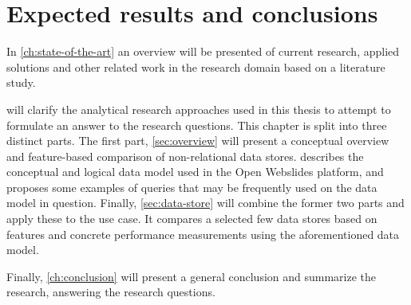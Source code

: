 \section{Expected results and conclusions}
\label{sec:expected-results-and-conclusions}


\clearpage{}

In \cref{ch:state-of-the-art} an overview will be presented of current research, applied solutions and other related work in the research domain based on a literature study.

 will clarify the analytical research approaches used in this thesis to attempt to formulate an answer to the research questions. This chapter is split into three distinct parts. The first part, \cref{sec:overview} will present a conceptual overview and feature-based comparison of non-relational data stores.  describes the conceptual and logical data model used in the Open Webslides platform, and proposes some examples of queries that may be frequently used on the data model in question. Finally, \cref{sec:data-store} will combine the former two parts and apply these to the use case. It compares a selected few data stores based on features and concrete performance measurements using the aforementioned data model.

Finally, \cref{ch:conclusion} will present a general conclusion and summarize the research, answering the research questions.
